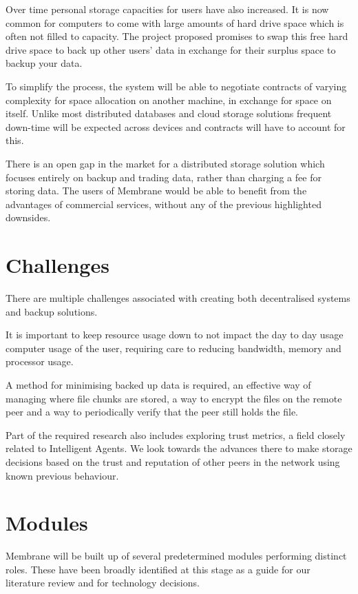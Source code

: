 \documentclass[11pt, a4paper, twocolumn, twoside]{report}
\begin{document}
Over time personal storage capacities for users have also increased. It is now common for computers to come with large amounts of hard drive space which is often not filled to capacity. The project proposed promises to swap this free hard drive space to back up other users’ data in exchange for their surplus space to backup your data.

To simplify the process, the system will be able to negotiate contracts of varying complexity for space allocation on another machine, in exchange for space on itself. Unlike most distributed databases and cloud storage solutions frequent down-time will be expected across devices and contracts will have to account for this.

There is an open gap in the market for a distributed storage solution which focuses entirely on backup and trading data, rather than charging a fee for storing data. The users of Membrane would be able to benefit from the advantages of commercial services, without any of the previous highlighted downsides.

\section{Challenges}
There are multiple challenges associated with creating both decentralised systems and backup solutions.

It is important to keep resource usage down to not impact the day to day usage computer usage of the user, requiring care to reducing bandwidth, memory and processor usage.

A method for minimising backed up data is required, an effective way of managing where file chunks are stored, a way to encrypt the files on the remote peer and a way to periodically verify that the peer still holds the file.

Part of the required research also includes exploring trust metrics, a field closely related to Intelligent Agents. We look towards the advances there to make storage decisions based on the trust and reputation of other peers in the network using known previous behaviour.

\section{Modules}

Membrane will be built up of several predetermined modules performing distinct roles. These have been broadly identified at this stage as a guide for our literature review and for technology decisions.
\end{document}
